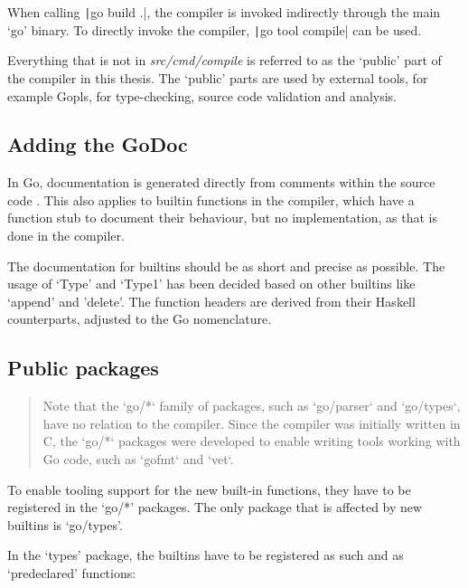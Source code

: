 When calling \texttt|go build .|, the compiler is invoked indirectly
through the main `go' binary. To directly invoke the compiler,
\texttt|go tool compile| can be used.

Everything that is not in \textit{src/cmd/compile} is referred to as the `public'
part of the compiler in this thesis. The `public' parts are used by external
tools, for example Gopls, for type-checking, source code validation and
analysis.

\subsection{Adding the GoDoc}
In Go, documentation is generated directly from comments within the source code
\autocite{godoc}. This also applies to builtin functions in the compiler, which
have a function stub to document their behaviour\autocite{godoc-builtin}, but
no implementation, as that is done in the compiler\autocite{builtin-impl}.

The documentation for builtins should be as short and precise as possible.
The usage of `Type' and `Type1' has been decided based on other builtins
like `append' and 'delete'.
The function headers are derived from their Haskell counterparts, adjusted
to the Go nomenclature.

\begin{code}
\end{code}
\subsection{Public packages}

\begin{quote}
Note that the `go/*` family of packages, such as `go/parser` and `go/types`,
have no relation to the compiler. Since the compiler was initially written in C,
the `go/*` packages were developed to enable writing tools working with Go code,
such as `gofmt` and `vet`.\autocite{compiler-readme}
\end{quote}

To enable tooling support for the new built-in functions, they have to be
registered in the `go/*' packages. The only package that is affected by new
builtins is `go/types'.

In the `types' package, the builtins have to be registered as such and as
`predeclared' functions:

